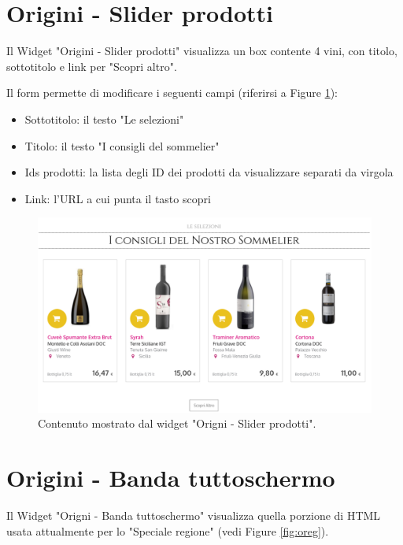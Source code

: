 


\newpage


\section{Origini - Slider prodotti}
Il Widget "Origini - Slider prodotti" visualizza un box contente
4 vini, con titolo, sottotitolo e link per "Scopri altro".

Il form permette di modificare i seguenti campi (riferirsi a Figure \ref{fig:oprod}):
\begin{itemize}
\item Sottotitolo: il testo "Le selezioni"
\item Titolo: il testo "I consigli del sommelier"
\item Ids prodotti: la lista degli ID dei prodotti da visualizzare separati da virgola
\item Link: l'URL a cui punta il tasto scopri
\end{itemize}

\begin{figure}
  \includegraphics[width=\textwidth]{figure/oprod.png}
  \caption{Contenuto mostrato dal widget "Origni - Slider prodotti".}
  \label{fig:oprod}
\end{figure}


\newpage
\section{Origini - Banda tuttoschermo}
Il Widget "Origni - Banda tuttoschermo" visualizza quella porzione di HTML
usata attualmente per lo "Speciale regione" (vedi Figure \ref{fig:oreg}).

